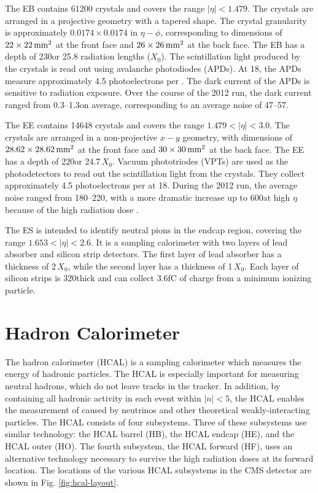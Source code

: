 The EB contains 61200 \pbwo crystals and covers the range $|\eta|<1.479$. The crystals are arranged in a projective geometry with a tapered shape. The crystal granularity is approximately $0.0174\times0.0174$ in $\eta-\phi$, corresponding to dimensions of $22\times22\,\text{mm}^{2}$ at the front face and $26\times26\,\text{mm}^{2}$ at the back face. The EB has a depth of 230\mm or 25.8 radiation lengths ($X_{0}$). The scintillation light produced by the \pbwo crystals is read out using avalanche photodiodes (APDs). At 18\degC, the APDs measure approximately 4.5 photoelectrons per \MeVns. The dark current of the APDs is sensitive to radiation exposure. Over the course of the 2012 run, the dark current ranged from 0.3--1.3\muA on average, corresponding to an average noise of 47--57\MeV \cite{CMS:2013ecal}.

The EE contains 14648 \pbwo crystals and covers the range $1.479<|\eta|<3.0$. The crystals are arranged in a non-projective $x-y$ geometry, with dimensions of $28.62\times28.62\,\text{mm}^{2}$ at the front face and $30\times30\,\text{mm}^{2}$ at the back face. The EE has a depth of 220\mm or 24.7$\,X_{0}$. Vacuum phototriodes (VPTs) are used as the photodetectors to read out the scintillation light from the \pbwo crystals. They collect approximately 4.5 photoelectrons per \MeVns at 18\degC. During the 2012 run, the average noise ranged from 180--220\MeV, with a more dramatic increase up to 600\MeV at high $\eta$ because of the high radiation dose \cite{CMS:2013ecal}.

The ES is intended to identify neutral pions in the endcap region, covering the range $1.653<|\eta|<2.6$. It is a sampling calorimeter with two layers of lead absorber and silicon strip detectors. The first layer of lead absorber has a thickness of 2$\,X_{0}$, while the second layer has a thickness of 1$\,X_{0}$. Each layer of silicon strips is 320\mum thick and can collect 3.6\unit{fC} of charge from a minimum ionizing particle.


\section{Hadron Calorimeter}

The hadron calorimeter (HCAL) is a sampling calorimeter which measures the energy of hadronic particles. The HCAL is especially important for measuring neutral hadrons, which do not leave tracks in the tracker. In addition, by containing all hadronic activity in each event within $|n|<5$, the HCAL enables the measurement of \met caused by neutrinos and other theoretical weakly-interacting particles. The HCAL consists of four subsystems. Three of these subsystems use similar technology: the HCAL barrel (HB), the HCAL endcap (HE), and the HCAL outer (HO). The fourth subsystem, the HCAL forward (HF), uses an alternative technology necessary to survive the high radiation doses at its forward location. The locations of the various HCAL subsystems in the CMS detector are shown in Fig. \ref{fig:hcal-layout}.

